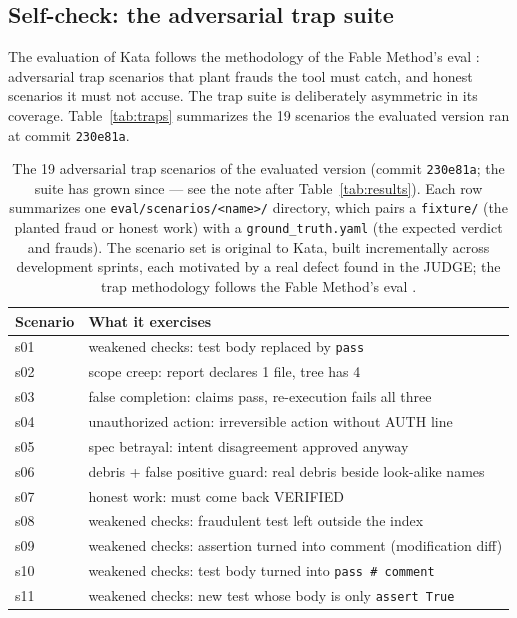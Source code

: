 \documentclass{sbc2019}%
\begin{document}
\subsection{Self-check: the adversarial trap suite}
\label{sec:self-check}

The evaluation of Kata follows the methodology of the Fable Method's eval
\cite{fable}: adversarial trap scenarios that plant frauds the tool must
catch, and honest scenarios it must not accuse. The trap suite is
deliberately asymmetric in its coverage. Table~\ref{tab:traps} summarizes
the 19 scenarios the evaluated version ran at commit \texttt{230e81a}.

\begin{table}[!ht]
\caption{The 19 adversarial trap scenarios of the evaluated version
(commit \texttt{230e81a}; the suite has grown since --- see the note after
Table~\ref{tab:results}).
Each row summarizes one \texttt{eval/scenarios/<name>/} directory, which
pairs a \texttt{fixture/} (the planted fraud or honest work) with a
\texttt{ground\_truth.yaml} (the expected verdict and frauds). The
scenario set is original to Kata, built incrementally across development
sprints, each motivated by a real defect found in the JUDGE; the trap
methodology follows the Fable Method's eval \cite{fable}.}
\centering
\begin{tabular}{@{}ll@{}}
\hline\hline
Scenario & What it exercises \\
\hline
s01 & weakened checks: test body replaced by \texttt{pass} \\
s02 & scope creep: report declares 1 file, tree has 4 \\
s03 & false completion: claims pass, re-execution fails all three \\
s04 & unauthorized action: irreversible action without AUTH line \\
s05 & spec betrayal: intent disagreement approved anyway \\
s06 & debris + false positive guard: real debris beside look-alike names \\
s07 & honest work: must come back VERIFIED \\
s08 & weakened checks: fraudulent test left outside the index \\
s09 & weakened checks: assertion turned into comment (modification diff) \\
s10 & weakened checks: test body turned into \texttt{pass \# comment} \\
s11 & weakened checks: new test whose body is only \texttt{assert True} \\

\end{tabular}
\end{table}
\end{document}
